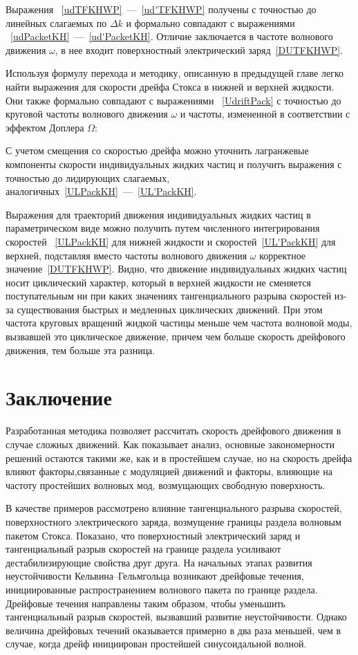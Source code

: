 Выражения ~\eqref{udTFKHWP}~---~\eqref{ud'TFKHWP} получены с точностью до линейных слагаемых по $ \Delta k $  и формально совпадают с выражениями ~\eqref{udPacketKH}~---~\eqref{ud'PacketKH}. Отличие заключается в частоте волнового движения  $ \omega $, в нее входит поверхностный электрический заряд~\eqref{DUTFKHWP}.

Используя формулу перехода  и методику, описанную в предыдущей главе легко найти выражения для скорости дрейфа Стокса в нижней   и верхней   жидкости. Они также формально совпадают с выражениями ~\eqref{UdriftPack} с точностью до круговой частоты волнового движения $ \omega $  и частоты, измененной в соответствии с эффектом Доплера $ \Omega $:
	  		  	
С учетом смещения со скоростью дрейфа можно уточнить лагранжевые компоненты скорости индивидуальных жидких частиц и получить выражения с точностью до лидирующих слагаемых, аналогичных~\eqref{ULPackKH}~---~\eqref{UL'PackKH}.
	  	
Выражения для траекторий движения индивидуальных жидких частиц в параметрическом виде можно получить путем численного интегрирования скоростей ~\eqref{ULPackKH} для нижней жидкости и скоростей~\eqref{UL'PackKH}  для верхней, подставляя вместо частоты волнового движения $ \omega $ корректное значение~\eqref{DUTFKHWP}. Видно, что движение индивидуальных жидких частиц носит циклический характер, который в верхней жидкости не сменяется поступательным ни при каких значениях тангенциального разрыва скоростей из-за существования быстрых и медленных циклических движений. При этом частота круговых вращений жидкой частицы меньше чем частота волновой моды, вызвавшей это циклическое движение, причем чем больше скорость дрейфового движения, тем больше эта разница.

 
\section{Заключение}
 
 Разработанная методика позволяет рассчитать скорость дрейфового движения в случае сложных движений. Как показывает анализ, основные закономерности решений остаются такими же, как и в простейшем случае, но на скорость дрейфа влияют факторы,связанные с модуляцией движений и факторы, влияющие на частоту простейших волновых мод, возмущающих свободную поверхность.
 
 В качестве примеров рассмотрено влияние тангенциального разрыва скоростей, поверхностного электрического заряда, возмущение границы раздела волновым пакетом Стокса. Показано, что поверхностный электрический заряд и тангенциальный разрыв скоростей на границе раздела усиливают дестабилизирующие свойства друг друга. На начальных этапах развития неустойчивости Кельвина--Гельмгольца возникают дрейфовые течения, инициированные распространением волнового пакета по границе раздела. Дрейфовые течения направлены таким образом, чтобы уменьшить тангенциальный разрыв скоростей, вызвавший развитие неустойчивости. Однако величина дрейфовых течений оказывается примерно в два раза меньшей, чем в случае, когда дрейф инициирован простейшей синусоидальной волной. 